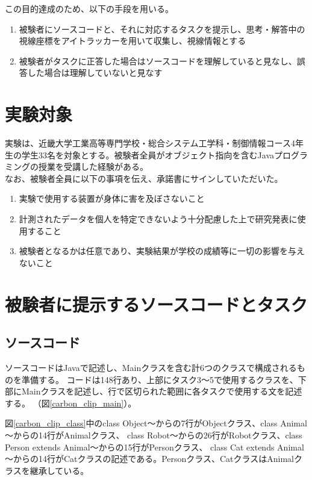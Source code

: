 \documentclass[paper=a4paper,fontsize=11pt]{jlreq}
\begin{document}
    この目的達成のため、以下の手段を用いる。
    \begin{enumerate}
      \item 被験者にソースコードと、それに対応するタスクを提示し、思考・解答中の視線座標をアイトラッカーを用いて収集し、視線情報とする
      \item 被験者がタスクに正答した場合はソースコードを理解していると見なし、誤答した場合は理解していないと見なす
    \end{enumerate}

  \section{実験対象}
    実験は、近畿大学工業高等専門学校・総合システム工学科・制御情報コース4年生の学生33名を対象とする。被験者全員がオブジェクト指向を含むJavaプログラミングの授業を受講した経験がある。\\
    なお、被験者全員に以下の事項を伝え、承諾書にサインしていただいた。
    \begin{enumerate}
      \item 実験で使用する装置が身体に害を及ぼさないこと
      \item 計測されたデータを個人を特定できないよう十分配慮した上で研究発表に使用すること
      \item 被験者となるかは任意であり、実験結果が学校の成績等に一切の影響を与えないこと
    \end{enumerate}

  \section{被験者に提示するソースコードとタスク}
    \subsection{ソースコード}
      ソースコードはJavaで記述し、Mainクラスを含む計6つのクラスで構成されるものを準備する。
      コードは148行あり、上部にタスク3～5で使用するクラスを、下部にMainクラスを記述し、行で区切られた範囲に各タスクで使用する文を記述する。
      （図\ref{carbon_clip_main}）。

      図\ref{carbon_clip_class}中のclass Object～からの7行がObjectクラス、class Animal～からの14行がAnimalクラス、
      class Robot～からの26行がRobotクラス、class Person extends Animal～からの15行がPersonクラス、
      class Cat extends Animal～からの14行がCatクラスの記述である。Personクラス、CatクラスはAnimalクラスを継承している。
\end{document}
